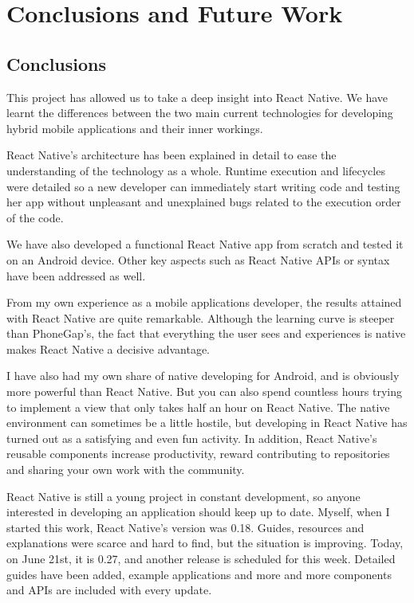 \chapter{Conclusions and Future Work}
\label{ch:conclusions}
\justifying

\section{Conclusions}

This project has allowed us to take a deep insight into React Native. We have learnt the differences between the two main current technologies for developing hybrid mobile applications and their inner workings. 

React Native's architecture has been explained in detail to ease the understanding of the technology as a whole. Runtime execution and lifecycles were detailed so a new developer can immediately start writing code and testing her app without unpleasant and unexplained bugs related to the execution order of the code.

We have also developed a functional React Native app from scratch and tested it on  an Android device. Other key aspects such as React Native APIs or syntax have been addressed as well. 

From my own experience as a mobile applications developer, the results attained with React Native are quite remarkable. Although the learning curve is steeper than PhoneGap's, the fact that everything the user sees and experiences is native makes React Native a decisive advantage. 

I have also had my own share of native developing for Android, and is obviously more powerful than React Native. But you can also spend countless hours trying to implement a view that only takes half an hour on React Native. The native environment can sometimes be a little hostile, but developing in React Native has turned out as a satisfying and even fun activity. In addition, React Native's reusable components increase productivity, reward contributing to repositories and sharing your own work with the community.

React Native is still a young project in constant development, so anyone interested in developing an application should keep up to date. Myself, when I started this work, React Native's version was 0.18. Guides, resources and explanations were scarce and hard to find, but the situation is improving. Today, on June 21st, it is 0.27, and another release is scheduled for this week. Detailed guides have been added, example applications and more and more components and APIs are included with every update.


